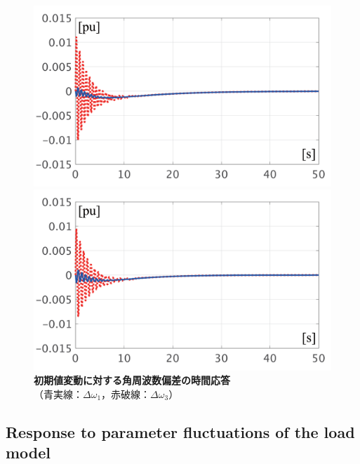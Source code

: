 \documentclass[tombow,dvipdfmx]{corona-a5-1.1}
\begin{document}
\begin{figure}[t]
  \centering
  {
  \begin{minipage}{0.49\linewidth}
    \centering
    \includegraphics[width = 1.0\linewidth]{figs/P1ini}
  \end{minipage}
  \begin{minipage}{0.49\linewidth}
    \centering
    \includegraphics[width = 1.0\linewidth]{figs/P3ini}
  \end{minipage}
  \medskip
  \caption{\textbf{初期値変動に対する角周波数偏差の時間応答}
  \\ \centering（青実線：$\Delta \omega_1$，赤破線：$\Delta \omega_3$）}
  \label{fig:P13ini}
  }
\medskip
\end{figure}

\subsection{Response to parameter fluctuations of the load model}\label{sec:resldpara}
\end{document}
